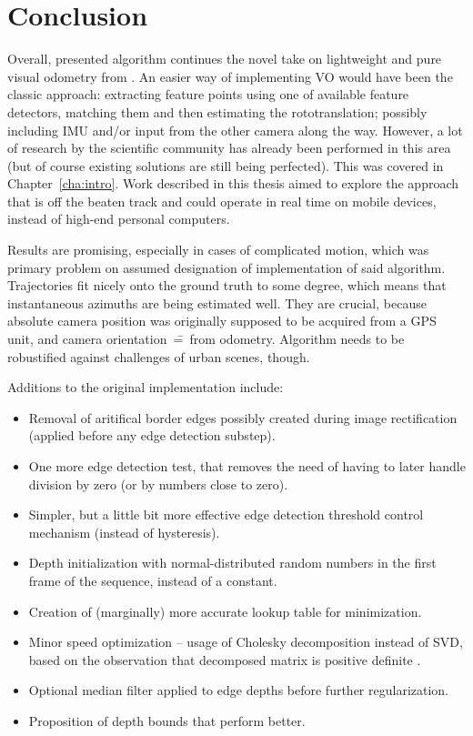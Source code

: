 \chapter{Conclusion}

Overall, presented algorithm continues the novel take on lightweight and pure visual odometry from \cite{jose2015realtime}. An easier way of implementing VO would have been the classic approach: extracting feature points using one of available feature detectors, matching them and then estimating the rototranslation; possibly including IMU and/or input from the other camera along the way. However, a lot of research by the scientific community has already been performed in this area (but of course existing solutions are still being perfected). This was covered in Chapter~\ref{cha:intro}. Work described in this thesis aimed to explore the approach that is off the beaten track and could operate in real time on mobile devices, instead of high-end personal computers.

Results are promising, especially in cases of complicated motion, which was primary problem on assumed designation of implementation of said algorithm. Trajectories fit nicely onto the ground truth to some degree, which means that instantaneous azimuths are being estimated well. They are crucial, because absolute camera position was originally supposed to be acquired from a GPS unit, and camera orientation~\==~from odometry. Algorithm needs to be robustified against challenges of urban scenes, though.

Additions to the original implementation \cite{jose2015realtime} include:
\begin{itemize}
	\item Removal of aritifical border edges possibly created during image rectification (applied before any edge detection substep).
	\item One more edge detection test, that removes the need of having to later handle division by zero (or by numbers close to zero).
	\item Simpler, but a little bit more effective edge detection threshold control mechanism (instead of hysteresis).
	\item Depth initialization with normal-distributed random numbers in the first frame of the sequence, instead of a constant.
	\item Creation of (marginally) more accurate lookup table for minimization.
	\item Minor speed optimization -- usage of Cholesky decomposition instead of SVD, based on the observation that decomposed matrix is positive definite \cite{madsen2004methods}.
	\item Optional median filter applied to edge depths before further regularization.
	\item Proposition of depth bounds that perform better.
\end{itemize}


